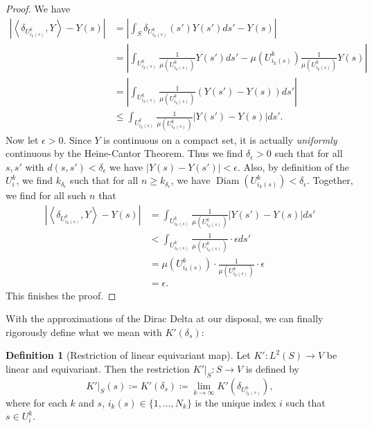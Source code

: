 \documentclass[12pt, a4paper]{article}
\theoremstyle{plain}
\theoremstyle{definition}
\newtheorem{dfn}[pro]{Definition}
\theoremstyle{remark}
\newcommand{\uu}{U_{i_k(s)}^k}
\DeclareMathOperator{\diam}{Diam}
\begin{document}
\begin{proof}
We have
\begin{align*}
\left| \left\langle  \delta_{\uu}, Y\right\rangle - Y(s)\right| & = \left| \int_{S} \delta_{\uu}(s')Y(s') ds' - Y(s) \right| \\
& = \left| \int_{\uu} \frac{1}{\mu\left(\uu \right)}Y(s') ds' - \mu\left(\uu\right) \frac{1}{\mu\left(\uu\right)}Y(s) \right| \\
& = \left| \int_{\uu} \frac{1}{\mu\left( \uu\right)} \left( Y(s') - Y(s)\right) ds' \right| \\
& \leq \int_{\uu} \frac{1}{\mu\left( \uu\right)} \left| Y(s') - Y(s) \right|ds'.
\end{align*}
Now let $\epsilon > 0$. Since $Y$ is continuous on a compact set, it is actually \emph{uniformly} continuous by the Heine-Cantor Theorem. Thus we find $\delta_{\epsilon} > 0$ such that for all $s, s'$ with $d(s,s')< \delta_\epsilon$ we have $|Y(s) - Y(s')| < \epsilon$. Also, by definition of the $U_i^k$, we find $k_{\delta_{\epsilon}}$ such that for all $n \geq k_{\delta_{\epsilon}}$, we have $\diam\left(\uu\right) < \delta_{\epsilon}$. Together, we find for all such $n$ that
\begin{align*}
\left| \left\langle  \delta_{\uu}, Y\right\rangle - Y(s)\right| & = \int_{\uu} \frac{1}{\mu\left( \uu\right)} \left| Y(s') - Y(s) \right|ds' \\
& < \int_{\uu} \frac{1}{\mu\left( \uu\right)} \cdot \epsilon ds' \\
& = \mu\left( \uu\right) \cdot \frac{1}{\mu\left( \uu\right)} \cdot \epsilon \\
& = \epsilon.
\end{align*}
This finishes the proof.
\end{proof}

With the approximations of the Dirac Delta at our disposal, we can finally rigorously define what we mean with $K'(\delta_s)$:

\begin{dfn}[Restriction of linear equivariant map]
Let $K': L^2(S) \to V$ be linear and equivariant. Then the restriction $K'|_S: S \to V$ is defined by
\begin{equation*}
K'|_S(s) \coloneq K'(\delta_s) \coloneq \lim_{k \to \infty} K'\left(\delta_{U_{i_k(s)}^k}\right),
\end{equation*}
where for each $k$ and $s$, $i_k(s) \in \{1, \dots, N_k\}$ is the unique index $i$ such that $s \in U_{i}^{k}$.
\end{dfn}
\end{document}

